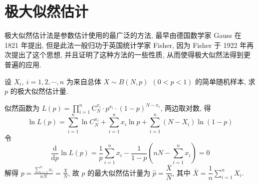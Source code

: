 

\section{极大似然估计}

极大似然估计法是参数估计使用的最广泛的方法, 最早由德国数学家 Gauss 在 1821 年提出,
但是此法一般归功于英国统计学家 Fisher, 因为 Fisher 于 1922 年再次提出了这个思想, 并且证明了这种方法的一些性质,
从而使得极大似然法得到更普遍的应用.

\begin{example}
    设 $X_i,~i=1,2,\cdots,n$ 为来自总体 $X\sim B(N,p)~~(0<p<1)$ 的简单随机样本, 求 $p$ 的极大似然估计量.
\end{example}
\begin{solution}
    似然函数为 $\displaystyle L(p)=\prod_{i=1}^{n} \mathrm{C}_{N}^{x_{i}} \cdot p^{x_{i}} \cdot(1-p)^{N-x_{i}} $, 两边取对数, 得
    $$\ln L(p)=\sum_{i=1}^{n} \ln C_{N}^{x_{i}}+\sum_{i=1}^{n} x_{i} \ln p+\sum_{i=1}^{n}\left(N-X_{i}\right) \ln (1-p)$$
    令 $$\frac{\mathrm{d}}{\mathrm{d} p} \ln L(p)=\frac{1}{p} \sum_{i=1}^{n} x_{i}-\frac{1}{1-p}\left(n N-\sum_{i=1}^{n} x_{i}\right)=0$$
    解得 $\displaystyle p=\frac{\displaystyle \sum_{i=1}^{n} x_{i}}{n N}=\frac{\bar{X}}{N} $, 故 $ p $ 的最大似然估计量为 $ \hat{p}=\dfrac{\bar{X}}{N} $,
    其中 $ \displaystyle\bar{X}=\dfrac{1}{n} \sum_{i=1}^{n} X_{i} .$
\end{solution}

